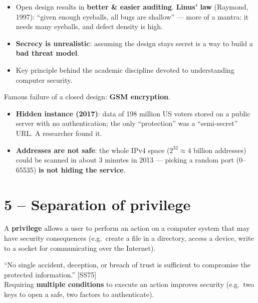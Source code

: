 \begin{propbox}[title=Why open design?]
\begin{itemize}
  \item Open design results in \textbf{better \& easier auditing}. \textbf{Linus' law}
        (Raymond, 1997): ``given enough eyeballs, all bugs are shallow'' --- more of a
        mantra: it needs many eyeballs, and defect density is high.
  \item \textbf{Secrecy is unrealistic}: assuming the design stays secret is a way to
        build a \textbf{bad threat model}.
  \item Key principle behind the academic discipline devoted to understanding computer
        security.
\end{itemize}
Famous failure of a closed design: \textbf{GSM encryption}.
\end{propbox}

\begin{exbox}[title=Security through obscurity does not work]
\begin{itemize}
  \item \textbf{Hidden instance (2017)}: data of 198 million US voters stored on a
        public server with no authentication; the only ``protection'' was a
        ``semi-secret'' URL. A researcher found it.
  \item \textbf{Addresses are not safe}: the whole IPv4 space ($2^{32}\approx 4$
        billion addresses) could be scanned in about 3 minutes in 2013 --- picking a
        random port (0--65535) \textbf{is not hiding the service}.
\end{itemize}
\end{exbox}

\section{5 -- Separation of privilege}

\begin{defnbox}[title=Privilege]
A \textbf{privilege} allows a user to perform an action on a computer system that may
have security consequences (e.g.\ create a file in a directory, access a device, write
to a socket for communicating over the Internet).
\end{defnbox}

\begin{defnbox}[title=Separation of privilege]
``No single accident, deception, or breach of trust is sufficient to compromise the
protected information.'' [SS75] \\
Requiring \textbf{multiple conditions} to execute an action improves security
(e.g.\ two keys to open a safe, two factors to authenticate).
\end{defnbox}

